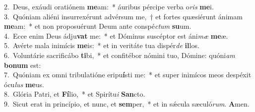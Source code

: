{2.~}Deus, exáudi oratiónem \textbf{me}am:~* áuribus pércipe verba o\textit{ris} \textbf{me}i.\\
{3.~}Quóniam aliéni insurrexérunt advérsum me,~† et fortes quæsiérunt ánimam \textbf{me}am:~* et non proposuérunt Deum ante conspé\textit{ctum} \textbf{su}um.\\
{4.~}Ecce enim Deus ádju\textbf{vat} me:~* et Dóminus suscéptor est áni\textit{mæ} \textbf{me}æ.\\
{5.~}Avérte mala inimícis \textbf{me}is:~* et in veritáte tua dispér\textit{de} \textbf{il}los.\\
{6.~}Voluntárie sacrificábo \textbf{ti}bi,~* et confitébor nómini tuo, Dómine: quóni\textit{am} \textbf{bo}\textbf{num} est:\\
{7.~}Quóniam ex omni tribulatióne eripu\textbf{í}sti me:~* et super inimícos meos despéxit ócu\textit{lus} \textbf{me}us.\\
{8.~}Glória Patri, et \textbf{Fí}lio,~* et Spirítu\textit{i} \textbf{San}cto.\\
{9.~}Sicut erat in princípio, et nunc, et \textbf{sem}per,~* et in sǽcula sæculó\textit{rum}. \textbf{A}men.\\
